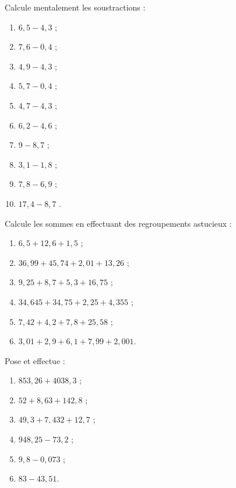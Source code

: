 \begin{exercice}
Calcule mentalement les soustractions :
\begin{enumerate} 
 \item $6,5 - 4,3$ \dotfill ; 
 
 \item $7,6 - 0,4$ \dotfill ; 
 
 \item $4,9 - 4,3$ \dotfill ; 
 
 \item $5,7 - 0,4$ \dotfill ; 
 
 \item $4,7 - 4,3$ \dotfill ; 
 
 \item $6,2 - 4,6$ \dotfill ; 
 
 \item $9 - 8,7$ \dotfill ; 
 
 \item $3,1 - 1,8$ \dotfill ; 
 
 \item $7,8 - 6,9$ \dotfill ; 
 
 \item \hspace{0.2em}$17,4 - 8,7$ \dotfill. 
 
 \end{enumerate}  
\end{exercice}


\begin{exercice}
Calcule les sommes en effectuant des regroupements astucieux :
\begin{enumerate} 
 \item $6,5 + 12,6 + 1,5$ ;
 \item $36,99 + 45,74 + 2,01 + 13,26$ ;
 \item $9,25 + 8,7 + 5,3 + 16,75$ ;
 \item $34,645 + 34,75 + 2,25 + 4,355$ ;
 \item $7,42 + 4,2 + 7,8 + 25,58$ ;
 \item $3,01 + 2,9 + 6,1 + 7,99 + 2,001$.
 \end{enumerate}
\end{exercice}


\begin{exercice}
Pose et effectue :
\begin{enumerate} 
 \item $853,26 + 4 038,3$ ;
 \item $52 + 8,63 + 142,8$ ;
 \item $49,3 + 7,432 + 12,7$ ;
 \item $948,25 - 73,2$ ;
 \item $9,8 - 0,073$ ;
 \item $83 - 43,51$.
 \end{enumerate} 
 \end{exercice}


